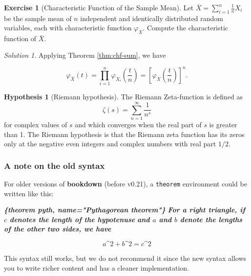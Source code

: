 \documentclass[
  12pt,
]{krantz}
\newenvironment{Shaded}{\begin{snugshade}}{\end{snugshade}}
\newcommand{\InformationTok}[1]{\textcolor[rgb]{0.56,0.35,0.01}{\textbf{\textit{#1}}}}
\theoremstyle{definition}
\theoremstyle{definition}
\theoremstyle{definition}
\newtheorem{exercise}{Exercise}[chapter]
\theoremstyle{definition}
\newtheorem{hypothesis}{Hypothesis}[chapter]
\theoremstyle{remark}
\newtheorem*{solution}{Solution}
\begin{document}
\begin{exercise}[Characteristic Function of the Sample Mean]
Let \(\bar{X}=\sum_{i=1}^n \frac{1}{n} X_i\) be the sample mean of \(n\) independent and identically distributed random variables, each with characteristic function \(\varphi _{X}\). Compute the characteristic function of \(\bar{X}\).
\end{exercise}

\begin{solution}
Applying Theorem \ref{thm:chf-sum}, we have

\[\varphi _{\bar{X}}(t)=\prod_{i=1}^n \varphi _{X_i}\left(\frac{t}{n}\right)=\left[\varphi _{X}\left(\frac{t}{n}\right)\right]^n.\]
\end{solution}

\begin{hypothesis}[Riemann hypothesis]
The Riemann Zeta-function is defined as
\[\zeta(s) = \sum_{n=1}^{\infty} \frac{1}{n^s}\]
for complex values of \(s\) and which converges when the real part of \(s\) is greater than 1. The Riemann hypothesis is that the Riemann zeta function has its zeros only at the negative even integers and complex numbers with real part \(1/2\).
\end{hypothesis}

\subsubsection{A note on the old syntax}\label{theorem-engine}

For older versions of \textbf{bookdown} (before v0.21), a \texttt{theorem} environment could be written like this:

\begin{Shaded}
\begin{Highlighting}[]
\InformationTok{\textasciigrave{}\textasciigrave{}\textasciigrave{}\{theorem pyth, name="Pythagorean theorem"\}}
\InformationTok{For a right triangle, if $c$ denotes the length of the hypotenuse}
\InformationTok{and $a$ and $b$ denote the lengths of the other two sides, we have}

\InformationTok{$$a\^{}2 + b\^{}2 = c\^{}2$$}
\InformationTok{\textasciigrave{}\textasciigrave{}\textasciigrave{}}
\end{Highlighting}
\end{Shaded}

This syntax still works, but we do not recommend it since the new syntax allows you to write richer content and has a cleaner implementation.
\end{document}
